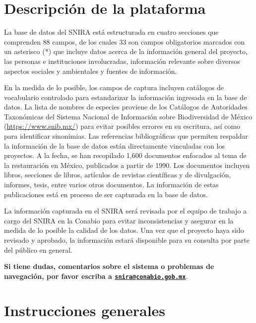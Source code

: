 \documentclass[
]{book}
\begin{document}
\hypertarget{descripciuxf3n-de-la-plataforma}{%
\chapter*{Descripción de la plataforma}\label{descripciuxf3n-de-la-plataforma}}

La base de datos del SNIRA está estructurada en cuatro secciones que comprenden 88 campos, de los cuales 33 son campos obligatorios marcados con un asterisco ({*}) que incluye datos acerca de la información general del proyecto, las personas e instituciones involucradas, información relevante sobre diversos aspectos sociales y ambientales y fuentes de información.

En la medida de lo posible, los campos de captura incluyen catálogos de vocabulario controlado para estandarizar la información ingresada en la base de datos. La lista de nombres de especies proviene de los Catálogos de Autoridades Taxonómicas del Sistema Nacional de Información sobre Biodiversidad de México (\url{https://www.snib.mx/}) para evitar posibles errores en su escritura, así como para identificar sinonimias. Las referencias bibliográficas que permiten respaldar la información de la base de datos están directamente vinculadas con los proyectos. A la fecha, se han recopilado 1,600 documentos enfocados al tema de la restauración en México, publicados a partir de 1990. Los documentos incluyen libros, secciones de libros, artículos de revistas científicas y de divulgación, informes, tesis, entre varios otros documentos. La información de estas publicaciones está en proceso de ser capturada en la base de datos.

La información capturada en el SNIRA será revisada por el equipo de trabajo a cargo del SNIRA en la Conabio para evitar inconsistencias y asegurar en la medida de lo posible la calidad de los datos. Una vez que el proyecto haya sido revisado y aprobado, la información estará disponible para su consulta por parte del público en general.

\textbf{Si tiene dudas, comentarios sobre el sistema o problemas de navegación, por favor escriba a \href{mailto:snira@conabio.gob.mx}{\nolinkurl{snira@conabio.gob.mx}}}.

\hypertarget{instrucciones-generales}{%
\chapter*{Instrucciones generales}\label{instrucciones-generales}}
\end{document}
